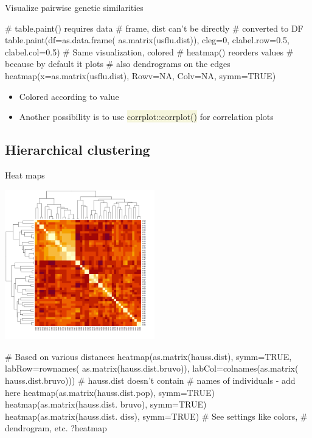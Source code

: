 \documentclass[compress, xelatex, 11pt, xcolor=svgnames, aspectratio=169,
	hyperref={
		bookmarks=true,
		unicode=true,
		colorlinks=true,
		pdftitle={Molecular data in R},
		plainpages=false,
		pdfauthor={Vojtech Zeisek},
		pdfsubject={Course about phylogeny and evolution in R},
		pdfcreator={XeLaTeX},
		pdfkeywords={R, evolution, phylogeny, molecular data},
		linkcolor=Crimson, %
		anchorcolor=Magenta, %
		citecolor=Magenta, %
		filecolor=Magenta, %
		menucolor=Magenta, %
		urlcolor=DodgerBlue, %
		},
	url={hyphens, lowtilde} %
	]{beamer}
\renewcommand{\texttt}[1]{\colorbox{Beige}{{\ttfamily #1}}}
\begin{document}
\begin{frame}[fragile]{Visualize pairwise genetic similarities}
	\begin{multicols}{2}
		\vfil
		\begin{spluscode}
    # table.paint() requires data
    # frame, dist can't be directly
    # converted to DF
    table.paint(df=as.data.frame(
      as.matrix(usflu.dist)), cleg=0,
      clabel.row=0.5, clabel.col=0.5)
    # Same visualization, colored
    # heatmap() reorders values
    # because by default it plots
    # also dendrograms on the edges
    heatmap(x=as.matrix(usflu.dist),
      Rowv=NA, Colv=NA, symm=TRUE)
		\end{spluscode}
		\vfill
		\begin{itemize}
			\item Colored according to value
			\item Another possibility is to use \texttt{corrplot::corrplot()} for correlation plots
		\end{itemize}
		\columnbreak
		\begin{center}
			\texttt{[image: dna-dists.png]}
		\end{center}
	\end{multicols}
\end{frame}

\subsection{Hierarchical clustering}

\begin{frame}[fragile]{Heat maps}
	\label{hierclust}
	\begin{multicols}{2}
		\includegraphics[height=6.5cm]{heatmap.png}
		\columnbreak
		\begin{spluscode}
    # Based on various distances
    heatmap(as.matrix(hauss.dist),
      symm=TRUE, labRow=rownames(
      as.matrix(hauss.dist.bruvo)),
      labCol=colnames(as.matrix(
      hauss.dist.bruvo)))
      # hauss.dist doesn't contain
      # names of individuals - add here
    heatmap(as.matrix(hauss.dist.pop),
      symm=TRUE)
    heatmap(as.matrix(hauss.dist.
      bruvo), symm=TRUE)
    heatmap(as.matrix(hauss.dist.
      diss), symm=TRUE)
    # See settings like colors,
    # dendrogram, etc.
    ?heatmap
		\end{spluscode}
	\end{multicols}
\end{frame}
\end{document}
